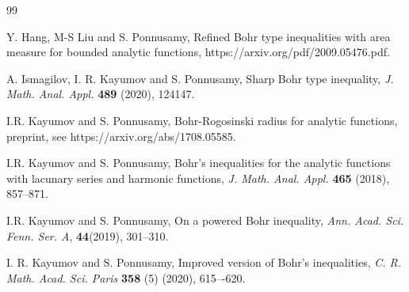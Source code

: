 \documentclass[a4paper,12pt]{amsart}
\theoremstyle{plain}
\theoremstyle{definition}
\begin{document}
\begin{thebibliography}{99}
	
	
	

	 {\sc Y. Hang}, {M-S Liu} and {\sc S. Ponnusamy}, Refined Bohr type inequalities with area measure for bounded analytic functions, https://arxiv.org/pdf/2009.05476.pdf.
	
	 {\sc A. Ismagilov, I. R. Kayumov} and {\sc S. Ponnusamy}, Sharp Bohr type inequality, 
	{\it J. Math. Anal. Appl.}  {\bf 489} (2020), 124147.
	
	
	
	 {\sc I.R. Kayumov} and {\sc S. Ponnusamy}, Bohr-Rogosinski radius for analytic functions, 
	preprint, see https://arxiv.org/abs/1708.05585.
	
	
	
	 {\sc I.R. Kayumov} and {\sc S. Ponnusamy}, Bohr's inequalities for the analytic functions with lacunary series and harmonic functions, 
	{\it J. Math. Anal. Appl.}  {\bf 465} (2018), 857--871.
	
	 {\sc I.R. Kayumov} and {\sc S. Ponnusamy}, On a powered Bohr inequality, \textit{Ann. Acad. Sci. Fenn. Ser. A}, \textbf{44}(2019), 301--310.
	
	 {\sc I. R. Kayumov} and {\sc S. Ponnusamy}, Improved version of Bohr's inequalities, 
	{\it C. R. Math. Acad. Sci. Paris} {\bf 358} (5) (2020), 615–-620.


\end{thebibliography}
\end{document}
